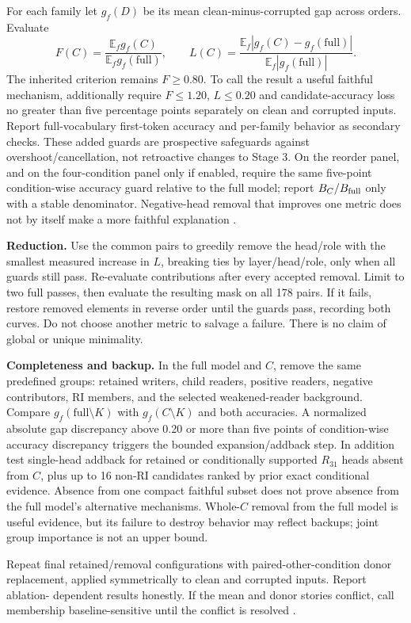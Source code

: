 \documentclass[11pt,a4paper]{article}
\newcommand{\E}{\mathbb{E}}
\begin{document}
For each family let $g_f(D)$ be its mean clean-minus-corrupted gap across orders.
Evaluate
\[
 F(C)=\frac{\E_f g_f(C)}{\E_f g_f(\mathrm{full})},\qquad
 L(C)=\frac{\E_f|g_f(C)-g_f(\mathrm{full})|}
 {\E_f|g_f(\mathrm{full})|}.
\]
The inherited criterion remains $F\ge0.80$. To call the result a useful faithful
mechanism, additionally require $F\le1.20$, $L\le0.20$ and candidate-accuracy loss
no greater than five percentage points separately on clean and corrupted inputs.
Report full-vocabulary first-token accuracy and per-family behavior as secondary
checks. These added guards are prospective safeguards against overshoot/cancellation,
not retroactive changes to Stage 3. On the reorder panel, and on the four-condition panel only if enabled, require
the same five-point condition-wise accuracy guard relative to the full model;
report $B_C/B_{\rm full}$ only with a stable denominator. Negative-head removal that
improves one metric does not by itself make a more faithful explanation
\cite{faith,robustness}.

\textbf{Reduction.} Use the common pairs to greedily remove the head/role with the
smallest measured increase in $L$, breaking ties by layer/head/role, only when all
guards still pass. Re-evaluate contributions after every accepted removal. Limit
to two full passes, then evaluate the resulting mask on all 178 pairs. If it fails,
restore removed elements in reverse order until the guards pass, recording both
curves. Do not choose another metric to salvage a failure. There is no claim of
global or unique minimality.

\textbf{Completeness and backup.} In the full model and $C$, remove the same
predefined groups: retained writers, child readers, positive readers, negative
contributors, RI members, and the selected weakened-reader background. Compare
$g_f(\mathrm{full}\setminus K)$ with $g_f(C\setminus K)$ and both accuracies.
A normalized absolute gap discrepancy above 0.20 or more than five points of
condition-wise accuracy discrepancy triggers the bounded expansion/addback step.
In addition test single-head addback for retained or conditionally supported $R_{31}$ heads absent from $C$, plus up to
16 non-RI candidates ranked by prior exact conditional evidence. Absence from one
compact faithful subset does not prove absence from the full model's alternative
mechanisms. Whole-$C$ removal from the full model is useful evidence, but its failure
to destroy behavior may reflect backups; joint group importance is not an upper bound.

Repeat final retained/removal configurations with paired-other-condition donor
replacement, applied symmetrically to clean and corrupted inputs. Report ablation-
dependent results honestly. If the mean and donor stories conflict, call membership
baseline-sensitive until the conflict is resolved \cite{best,robustness}.
\end{document}
